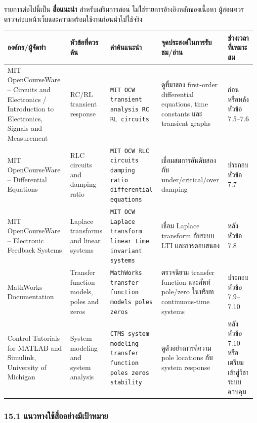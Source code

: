 รายการต่อไปนี้เป็น \textbf{สื่อแนะนำ} สำหรับเสริมการสอน ไม่ใช่รายการอ้างอิงหลักของเนื้อหา ผู้สอนควรตรวจสอบหน้าเว็บและความพร้อมใช้งานก่อนนำไปใช้จริง

\begin{table}[htbp]
    \centering
    \scriptsize
    \setlength{\tabcolsep}{3pt}
    \begin{tabularx}{\textwidth}{L{0.24\textwidth} L{0.15\textwidth} L{0.22\textwidth} Y L{0.15\textwidth}}
        \hline
        \textbf{องค์กร/ผู้จัดทำ} & \textbf{หัวข้อที่ควรค้น} & \textbf{คำค้นแนะนำ} & \textbf{จุดประสงค์ในการรับชม/อ่าน} & \textbf{ช่วงเวลาที่เหมาะสม} \\
        \hline
        MIT OpenCourseWare – Circuits and Electronics / Introduction to Electronics, Signals and Measurement & RC/RL transient response & \texttt{MIT OCW transient analysis RC RL circuits} & ดูที่มาของ first-order differential equations, time constants และ transient graphs & ก่อนหรือหลังหัวข้อ 7.5–7.6 \\
        MIT OpenCourseWare – Differential Equations & RLC circuits and damping ratio & \texttt{MIT OCW RLC circuits damping ratio differential equations} & เชื่อมสมการอันดับสองกับ under/critical/over damping & ประกอบหัวข้อ 7.7 \\
        MIT OpenCourseWare – Electronic Feedback Systems & Laplace transforms and linear systems & \texttt{MIT OCW Laplace transform linear time invariant systems} & เชื่อม Laplace transform กับระบบ LTI และการตอบสนอง & หลังหัวข้อ 7.8 \\
        MathWorks Documentation & Transfer function models, poles and zeros & \texttt{MathWorks transfer function models poles zeros} & ตรวจนิยาม transfer function และศัพท์ pole/zero ในบริบท continuous-time systems & ประกอบหัวข้อ 7.9–7.10 \\
        Control Tutorials for MATLAB and Simulink, University of Michigan & System modeling and system analysis & \texttt{CTMS system modeling transfer function poles zeros stability} & ดูตัวอย่างการตีความ pole locations กับ system response & หลังหัวข้อ 7.10 หรือเตรียมเข้าสู่วิชาระบบควบคุม \\
        \hline
    \end{tabularx}
\end{table}

\subsubsection{15.1 แนวทางใช้สื่ออย่างมีเป้าหมาย}

